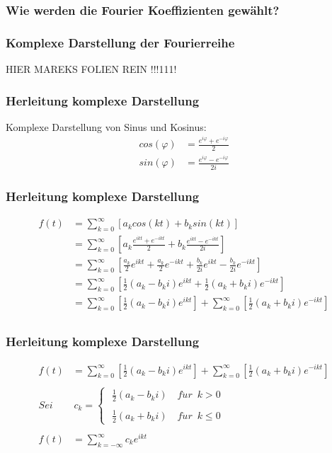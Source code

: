 \begin{frame}
	\frametitle{Wie werden die Fourier Koeffizienten gewählt?}
\end{frame}

\begin{frame}
	\frametitle{Komplexe Darstellung der Fourierreihe}
	HIER MAREKS FOLIEN REIN !!!111!
\end{frame}

\begin{frame}
	\frametitle{Herleitung komplexe Darstellung}
	Komplexe Darstellung von Sinus und Kosinus:
	\begin{align*}
		cos(\varphi) &= \frac{e^{i\varphi}+e^{-i\varphi}}{2} \\
		sin(\varphi) &= \frac{e^{i\varphi}-e^{-i\varphi}}{2i}
	\end{align*}
\end{frame}
\begin{frame}
	\frametitle{Herleitung komplexe Darstellung}
	\begin{align*}
		f(t) &= \sum_{k=0}^{\infty}\left[a_k cos(kt) + b_k sin(kt)\right] \\
		&= \sum_{k=0}^{\infty}\left[a_k \frac{e^{ikt}+e^{-ikt}}{2} + b_k \frac{e^{ikt}-e^{-ikt}}{2i}\right] \\
		&= \sum_{k=0}^{\infty}\left[\frac{a_k}{2}e^{ikt} + \frac{a_k}{2}e^{-ikt} + \frac{b_k}{2i}e^{ikt} - \frac{b_k}{2i}e^{-ikt}\right] \\
		&= \sum_{k=0}^{\infty}\left[\frac{1}{2}\left(a_k-b_ki\right)e^{ikt} + \frac{1}{2}\left(a_k+b_ki\right)e^{-ikt}\right] \\
		&= \sum_{k=0}^{\infty}\left[\frac{1}{2}\left(a_k-b_ki\right)e^{ikt}\right] + \sum_{k=0}^{\infty}\left[\frac{1}{2}\left(a_k+b_ki\right)e^{-ikt}\right] \\
	\end{align*}
\end{frame}

\begin{frame}
	\frametitle{Herleitung komplexe Darstellung}
	\begin{align*}
		f(t) &= \sum_{k=0}^{\infty}\left[\frac{1}{2}\left(a_k-b_ki\right)e^{ikt}\right] + \sum_{k=0}^{\infty}\left[\frac{1}{2}\left(a_k+b_ki\right)e^{-ikt}\right] \\ \\
		Sei \,\,\, &\,c_k = \begin{cases}
			\,\,\displaystyle\frac{1}{2}(a_k - b_ki) \quad f\ddot{u}r\,\,\, k > 0 \\ \\
			\,\,\displaystyle\frac{1}{2}(a_k + b_ki) \quad f\ddot{u}r\,\,\, k \le 0 
		\end{cases} \\ \\
	f(t) &= \sum_{k=-\infty}^{\infty}c_k e^{ikt}
	\end{align*}
\end{frame}

